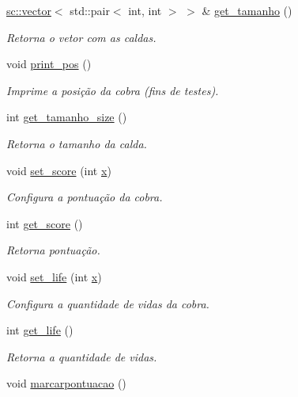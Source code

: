 \begin{DoxyCompactItemize}
\hyperlink{classsc_1_1vector}{sc\+::vector}$<$ std\+::pair$<$ int, int $>$ $>$ \& \hyperlink{classSnaze_a63c97c00033ad4e47f5609016a0cb0f3}{get\+\_\+tamanho} ()
\begin{DoxyCompactList}\small\item\em Retorna o vetor com as caldas. \end{DoxyCompactList}\item 
void \hyperlink{classSnaze_af621f316459a63cc4db4b55d577fe2ef}{print\+\_\+pos} ()
\begin{DoxyCompactList}\small\item\em Imprime a posição da cobra (fins de testes). \end{DoxyCompactList}\item 
int \hyperlink{classSnaze_a6704ada161bc8559e71401d5bad59b58}{get\+\_\+tamanho\+\_\+size} ()
\begin{DoxyCompactList}\small\item\em Retorna o tamanho da calda. \end{DoxyCompactList}\item 
void \hyperlink{classSnaze_a437fb5a032ce59212b62bf484e208d0d}{set\+\_\+score} (int \hyperlink{classSnaze_a437683faf08157e2c1e549c3ea1de441}{x})
\begin{DoxyCompactList}\small\item\em Configura a pontuação da cobra. \end{DoxyCompactList}\item 
int \hyperlink{classSnaze_a62bf08554d8952b29c040c4b2c572dab}{get\+\_\+score} ()
\begin{DoxyCompactList}\small\item\em Retorna pontuação. \end{DoxyCompactList}\item 
void \hyperlink{classSnaze_a937b8d382ef2babd14ac37f1e2831be8}{set\+\_\+life} (int \hyperlink{classSnaze_a437683faf08157e2c1e549c3ea1de441}{x})
\begin{DoxyCompactList}\small\item\em Configura a quantidade de vidas da cobra. \end{DoxyCompactList}\item 
int \hyperlink{classSnaze_a9c5c5706980645098dc478bc6fe255a5}{get\+\_\+life} ()
\begin{DoxyCompactList}\small\item\em Retorna a quantidade de vidas. \end{DoxyCompactList}\item 
void \hyperlink{classSnaze_afb6cfbbeffc84c668c7c205623557654}{marcarpontuacao} ()

\end{DoxyCompactItemize}
